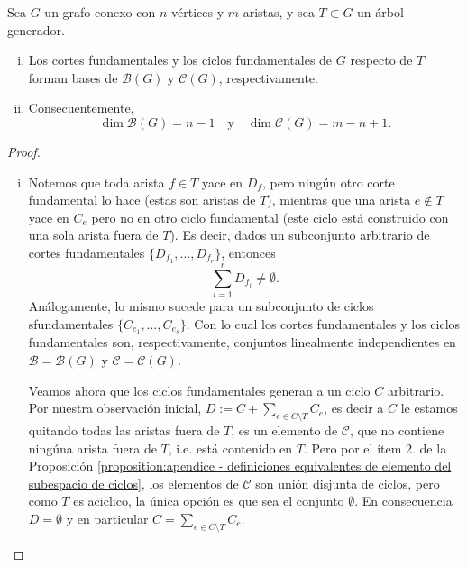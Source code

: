 \documentclass[../main.tex]{subfiles}
\begin{document}
\begin{theorem}
Sea $G$ un grafo conexo con $n$ vértices y $m$ aristas, y sea $T \subset G$ un árbol generador.
\begin{enumerate}[(i)]
\item Los cortes fundamentales y los ciclos fundamentales de $G$ respecto de $T$ forman bases de $\mathcal{B}(G)$ y $\mathcal{C}(G)$, respectivamente.
\item Consecuentemente,
$$
\dim \mathcal{B}(G) = n-1 \quad \text{y} \quad \dim \mathcal{C}(G) = m - n + 1.
$$
\end{enumerate}
\end{theorem}
\begin{proof}
\begin{enumerate}[(i)]
\item Notemos que toda arista $f \in T$ yace en $D_f$, pero ningún otro corte fundamental lo hace (estas son aristas de $T$), mientras que una arista $e \not \in T$ yace en $C_e$ pero no en otro ciclo fundamental (este ciclo está construido con una sola arista fuera de $T$).
Es decir, dados un subconjunto arbitrario de cortes fundamentales $\{ D_{f_1}, \ldots, D_{f_r}\}$, entonces
$$
\sum_{i = 1}^r D_{f_i} \neq \emptyset.
$$
Análogamente, lo mismo sucede para un subconjunto de ciclos sfundamentales $\{ C_{e_1}, \ldots, C_{e_s} \}$.
Con lo cual los cortes fundamentales y los ciclos fundamentales son, respectivamente, conjuntos linealmente independientes en $\mathcal B = \mathcal B (G)$ y $\mathcal C  = \mathcal C (G)$.

Veamos ahora que los ciclos fundamentales generan a un ciclo $C$ arbitrario. Por nuestra observación inicial, $D := C + \sum_{e \in C \setminus T} C_e$, es decir a $C$ le estamos quitando todas las aristas fuera de $T$, es un elemento de $\mathcal C$, que no contiene ningúna arista fuera de $T$, i.e. está contenido en $T$. Pero por el ítem 2. de la Proposición \ref{proposition:apendice - definiciones equivalentes de elemento del subespacio de ciclos}, los elementos de $\mathcal C$ son unión disjunta de ciclos, pero como $T$ es aciclico, la única opción es que sea el conjunto $\emptyset$. En consecuencia $D = \emptyset$ y en particular $C = \sum_{e \in C \setminus T} C_e$.


\end{enumerate}
\end{proof}
\end{document}
